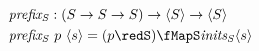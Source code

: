 \documentclass[preview]{standalone}
\begin{document}
\begin{align*}%
    \mathit{prefix_S} &: (S \rightarrow S \rightarrow S) \rightarrow \vect{S} \rightarrow \vect{S}\\
    \mathit{prefix_S} &\ p\ \vect{s} = (p \redS) \fMapS \mathit{inits_S} \vect{s}%
\end{align*}
\end{document}
